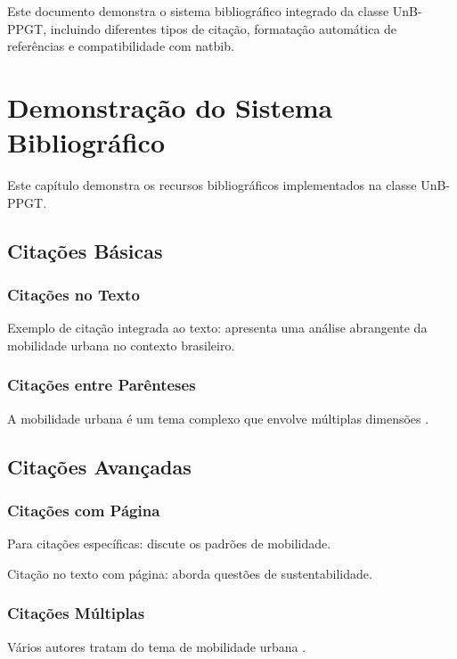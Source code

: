 \documentclass[mestrado]{UnB-PPGT}
\begin{document}
\pretextual

\begin{resumo}
Este documento demonstra o sistema bibliográfico integrado da classe UnB-PPGT, incluindo diferentes tipos de citação, formatação automática de referências e compatibilidade com natbib.
\end{resumo}

\textual

\chapter{Demonstração do Sistema Bibliográfico}

Este capítulo demonstra os recursos bibliográficos implementados na classe UnB-PPGT.

\section{Citações Básicas}

\subsection{Citações no Texto}
Exemplo de citação integrada ao texto:  apresenta uma análise abrangente da mobilidade urbana no contexto brasileiro.

\subsection{Citações entre Parênteses}
A mobilidade urbana é um tema complexo que envolve múltiplas dimensões \cite{vasconcellos2012}.

\section{Citações Avançadas}

\subsection{Citações com Página}
Para citações específicas:  discute os padrões de mobilidade.

Citação no texto com página:  aborda questões de sustentabilidade.

\subsection{Citações Múltiplas}
Vários autores tratam do tema de mobilidade urbana \cite{vasconcellos2012,silva2019,oliveira2021}.
\end{document}
